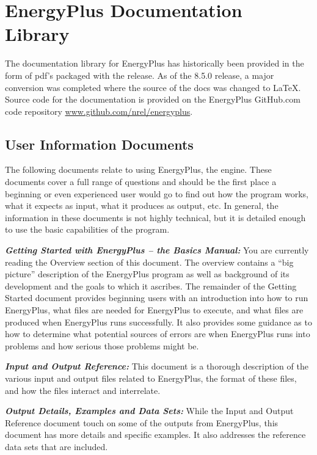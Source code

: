 \section{EnergyPlus Documentation Library}\label{energyplus-documentation-library}

The documentation library for EnergyPlus has historically been provided in the form of pdf's packaged with the release. As of the 8.5.0 release, a major conversion was completed where the source of the docs was changed to \LaTeX. Source code for the documentation is provided on the EnergyPlus GitHub.com code repository \url{www.github.com/nrel/energyplus}.

\subsection{User Information Documents}\label{user-information-documents}

The following documents relate to using EnergyPlus, the engine. These documents cover a full range of questions and should be the first place a beginning or even experienced user would go to find out how the program works, what it expects as input, what it produces as output, etc. In general, the information in these documents is not highly technical, but it is detailed enough to use the basic capabilities of the program.

\textbf{\emph{Getting Started with EnergyPlus -- the Basics Manual:}} You are currently reading the Overview section of this document. The overview contains a ``big picture'' description of the EnergyPlus program as well as background of its development and the goals to which it ascribes. The remainder of the Getting Started document provides beginning users with an introduction into how to run EnergyPlus, what files are needed for EnergyPlus to execute, and what files are produced when EnergyPlus runs successfully. It also provides some guidance as to how to determine what potential sources of errors are when EnergyPlus runs into problems and how serious those problems might be.

\textbf{\emph{Input and Output Reference:}} This document is a thorough description of the various input and output files related to EnergyPlus, the format of these files, and how the files interact and interrelate.

\textbf{\emph{Output Details, Examples and Data Sets:}} While the Input and Output Reference document touch on some of the outputs from EnergyPlus, this document has more details and specific examples. It also addresses the reference data sets that are included.

